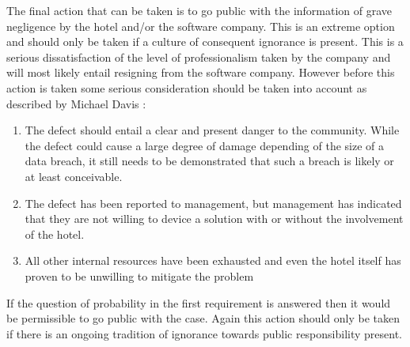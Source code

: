 The final action that can be taken is to go public with the information of grave negligence by the hotel and/or the software company. This is an extreme option and should only be taken if a culture of consequent ignorance is present. This is a serious dissatisfaction of the level of professionalism taken by the company and will most likely entail resigning from the software company. However before this action is taken some serious consideration should be taken into account as described by Michael Davis \cite{whistleblowing_paradoxes}:
\begin{enumerate}
\item The defect should entail a clear and present danger to the community. While the defect could cause a large degree of damage depending of the size of a data breach, it still needs to be demonstrated that such a breach is likely or at least conceivable.
\item The defect has been reported to management, but management has indicated that they are not willing to device a solution with or without the involvement of the hotel.
\item All other internal resources have been exhausted and even the hotel itself has proven to be unwilling to mitigate the problem
\end{enumerate}
If the question of probability in the first requirement is answered then it would be permissible to go public with the case. Again this action should only be taken if there is an ongoing tradition of ignorance towards public responsibility present.
